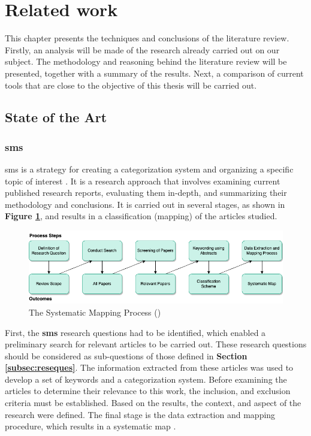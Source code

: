 \section{Related work\label{sec:relwork}}
This chapter presents the techniques and conclusions of the literature review. Firstly, an analysis will be made of the research already carried out on our subject. The methodology and reasoning behind the literature review will be presented, together with a summary of the results. Next, a comparison of current tools that are close to the objective of this thesis will be carried out.\\



    \subsection{State of the Art}
        \subsubsection{\acrlong{sms}}
        \acrfull{sms} is a strategy for creating a categorization system and organizing a specific topic of interest \cite{petersen2008systematic}. It is a research approach that involves examining current published research reports, evaluating them in-depth, and summarizing their methodology and conclusions. It is carried out in several stages, as shown in \textbf{Figure \ref{fig:SysMapProcess}}, and results in a classification (mapping) of the articles studied.\\

        \begin{figure}[h]
            \centering
            \includegraphics[scale=0.6]{images/RelatedWork-SysMapProcess.drawio.png}
            \caption[The Systematic Mapping Process]{\label{fig:SysMapProcess}  The Systematic Mapping Process (\cite{petersen2008systematic})}
        \end{figure}

        First, the \textbf{\acrshort{sms}} research questions had to be identified, which enabled a preliminary search for relevant articles to be carried out. These research questions should be considered as sub-questions of those defined in \textbf{Section \ref{subsec:reseques}}. The information extracted from these articles was used to develop a set of keywords and a categorization system. Before examining the articles to determine their relevance to this work, the inclusion, and exclusion criteria must be established. Based on the results, the context, and aspect of the research were defined. The final stage is the data extraction and mapping procedure, which results in a systematic map \cite{petersen2008systematic, petersen2015guidelines}.\\

